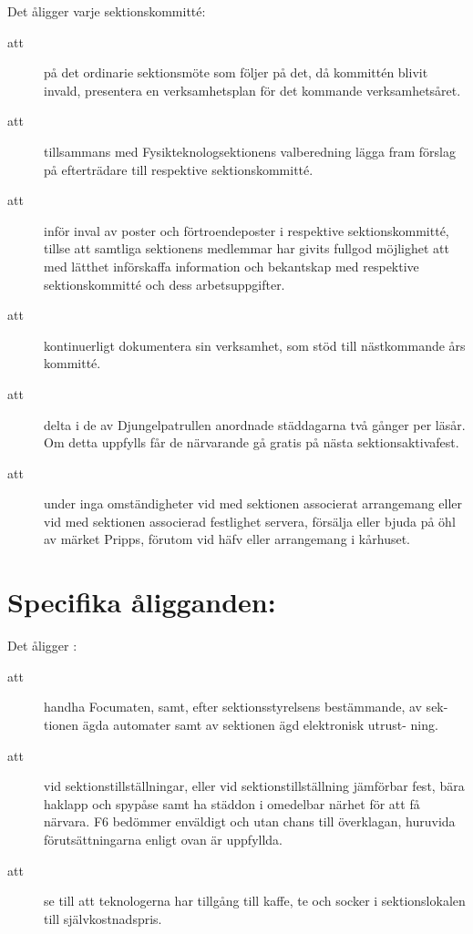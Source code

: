 Det åligger varje sektionskommitté:
\begin{description}
    \item[att] på det ordinarie sektionsmöte som följer på det, då kommittén blivit invald, presentera en verksamhetsplan för det kommande verksamhetsåret.
      \item[att] tillsammans med Fysikteknologsektionens valberedning lägga fram förslag på efterträdare till respektive sektionskommitté.
      \item[att] inför inval av poster och förtroendeposter i respektive sektionskommitté, tillse att samtliga sektionens medlemmar har givits fullgod möjlighet att med lätthet införskaffa information och bekantskap med respektive sektionskommitté och dess arbetsuppgifter.
      \item[att] kontinuerligt dokumentera sin verksamhet, som stöd till näst\-komm\-ande års kommitté.
      \item[att] delta i de av Djungelpatrullen anordnade städdagarna två gånger per
      läsår. Om detta uppfylls får de närvarande gå gratis på nästa
      sektionsaktivafest.
      \item[att] under inga omständigheter vid med sektionen associerat arrangemang eller vid med sektionen associerad festlighet servera, försälja eller bjuda på öhl av märket Pripps, förutom vid häfv eller arrangemang i kårhuset.
      
    \end{description}

\section{Specifika åligganden:}

Det åligger \forening :
\begin{description}
\item[att] handha Focumaten, samt, efter sektionsstyrelsens bestämmande, av sek-
tionen ägda automater samt av sektionen ägd elektronisk utrust-
ning.

\item[att] vid sektionstillställningar, eller vid sektionstillställning jämförbar fest, bära haklapp och spypåse samt ha städdon i omedelbar närhet för att få närvara. F6 bedömmer enväldigt och utan chans till överklagan, huruvida förutsättningarna enligt ovan är uppfyllda.
 
\item[att] se till att teknologerna har tillgång till kaffe, te och socker i sektionslokalen till självkostnadspris.

\end{description}

